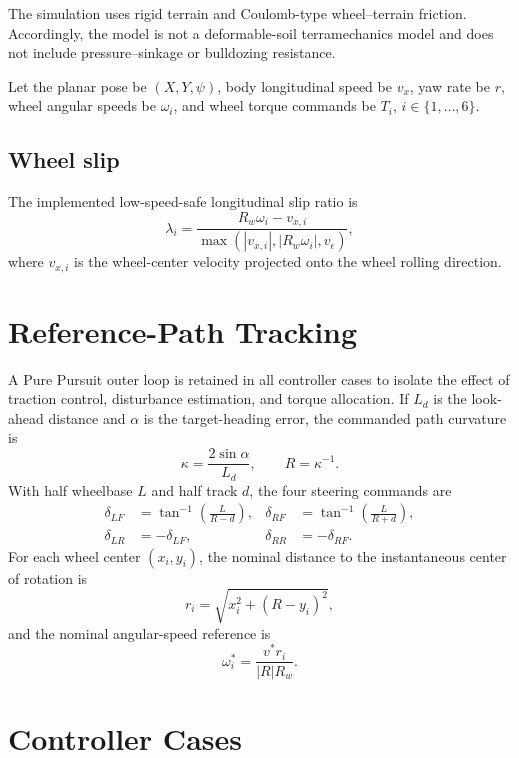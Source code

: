 \documentclass[11pt]{article}
\begin{document}
The simulation uses rigid terrain and Coulomb-type wheel--terrain friction. Accordingly, the model is not a deformable-soil terramechanics model and does not include pressure--sinkage or bulldozing resistance.

Let the planar pose be $(X,Y,\psi)$, body longitudinal speed be $v_x$, yaw rate be $r$, wheel angular speeds be $\omega_i$, and wheel torque commands be $T_i$, $i\in\{1,\ldots,6\}$.

\subsection{Wheel slip}
The implemented low-speed-safe longitudinal slip ratio is
\begin{equation}
\lambda_i = \frac{R_w\omega_i-v_{x,i}}
{\max\left(|v_{x,i}|,|R_w\omega_i|,v_\epsilon\right)},
\end{equation}
where $v_{x,i}$ is the wheel-center velocity projected onto the wheel rolling direction.

\section{Reference-Path Tracking}
A Pure Pursuit outer loop is retained in all controller cases to isolate the effect of traction control, disturbance estimation, and torque allocation. If $L_d$ is the look-ahead distance and $\alpha$ is the target-heading error, the commanded path curvature is
\begin{equation}
\kappa = \frac{2\sin\alpha}{L_d}, \qquad R=\kappa^{-1}.
\end{equation}
With half wheelbase $L$ and half track $d$, the four steering commands are
\begin{align}
\delta_{LF} &= \tan^{-1}\!\left(\frac{L}{R-d}\right), &
\delta_{RF} &= \tan^{-1}\!\left(\frac{L}{R+d}\right),\\
\delta_{LR} &= -\delta_{LF}, &
\delta_{RR} &= -\delta_{RF}.
\end{align}
For each wheel center $(x_i,y_i)$, the nominal distance to the instantaneous center of rotation is
\begin{equation}
r_i = \sqrt{x_i^2+(R-y_i)^2},
\end{equation}
and the nominal angular-speed reference is
\begin{equation}
\omega_i^* = \frac{v^* r_i}{|R|R_w}.
\end{equation}

\section{Controller Cases}
\end{document}
